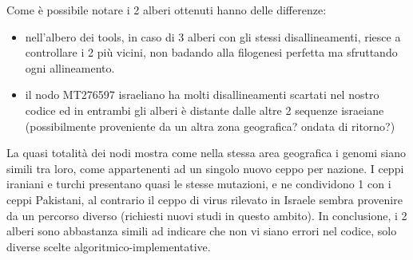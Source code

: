 \documentclass[11pt,italian]{article}
\begin{document}
Come è possibile notare i 2 alberi ottenuti hanno delle differenze:
\begin{itemize}
	\item nell'albero dei tools, in caso di 3 alberi con gli stessi disallineamenti, riesce a controllare i 2 più vicini, non badando alla filogenesi perfetta ma sfruttando ogni allineamento.
	\item il nodo MT276597 israeliano ha molti disallineamenti scartati nel nostro codice ed in entrambi gli alberi è distante dalle altre 2 sequenze israeiane (possibilmente proveniente da un altra zona geografica? ondata di ritorno?)
\end{itemize}
La quasi totalità dei nodi mostra come nella stessa area geografica i genomi siano simili tra loro, come appartenenti ad un singolo nuovo ceppo per nazione. \newline
I ceppi iraniani e turchi presentano quasi le stesse mutazioni, e ne condividono 1 con i ceppi Pakistani, al contrario il ceppo di virus rilevato in Israele sembra provenire da un percorso diverso (richiesti nuovi studi in questo ambito).\newline 
In conclusione, i 2 alberi sono abbastanza simili ad indicare che non vi siano errori nel codice, solo diverse scelte algoritmico-implementative.
\end{document}
